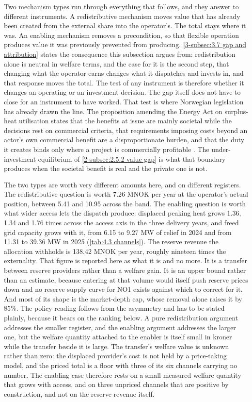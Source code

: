 Two mechanism types run through everything that follows, and they answer to different instruments. A redistributive mechanism moves value that has already been created from the external share into the operator's. The total stays where it was. An enabling mechanism removes a precondition, so that flexible operation produces value it was previously prevented from producing. \autoref{3-subsec:3.7 gap and attribution} states the consequence this subsection argues from: redistribution alone is neutral in welfare terms, and the case for it is the second step, that changing what the operator earns changes what it dispatches and invests in, and that response moves the total. The test of any instrument is therefore whether it changes an operating or an investment decision. The gap itself does not have to close for an instrument to have worked. That test is where Norwegian legislation has already drawn the line. The proposition amending the Energy Act on surplus-heat utilisation states that the benefits at issue are mainly societal while the decisions rest on commercial criteria, that requirements imposing costs beyond an actor's own commercial benefit are a disproportionate burden, and that the duty it creates binds only where a project is commercially profitable \cite{det_kongelige_energidepartement_endringer_2026}. The under-investment equilibrium of \autoref{2-subsec:2.5.2 value gap} is what that boundary produces when the societal benefit is real and the private one is not.

The two types are worth very different amounts here, and on different registers. The redistributive question is worth 7.26 MNOK per year at the operator's actual position, between 5.41 and 10.95 across the band. The enabling question is worth what wider access lets the dispatch produce: displaced peaking heat grows 1.36, 1.34 and 1.76 times across the access axis in the three delivery years, and freed grid capacity grows with it, from 6.15 to 9.27 MW of relief in 2024 and from 11.31 to 39.36 MW in 2025 (\autoref{tab:4.3 channels}). The reserve revenue the allocation withholds is 138.42 MNOK per year, roughly nineteen times the externality. That figure is reported here as what it is and no more. It is a transfer between reserve providers rather than a welfare gain. It is an upper bound rather than an estimate, because entering at that volume would itself push reserve prices down and no reserve supply curve for NO1 exists against which to correct for it. And most of its shape is the market-depth cap, whose removal alone raises it by $85\%$. The policy reading follows from the asymmetry and has to be stated plainly, because it bears on the ranking below. A pure redistribution argument addresses the smaller register, and the enabling argument addresses the larger one, but the welfare quantity attached to the enabler is itself small in kroner while the transfer beside it is large. The transfer's welfare value is unknown rather than zero: the displaced provider's cost is not held by a price-taking model, and the priced total is a floor with three of its six channels carrying no number. The enabling case therefore rests on a small measured welfare quantity that grows with access, and on three unpriced channels that are positive by construction, and not on the reserve revenue itself.

